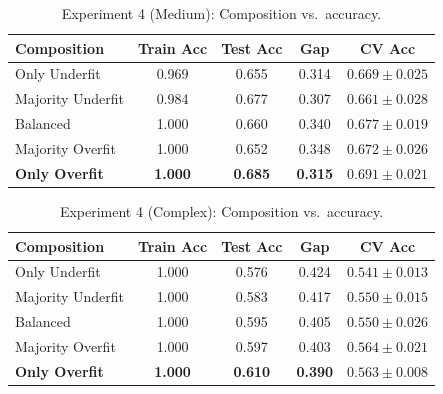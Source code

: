 \documentclass[conference]{IEEEtran}
\begin{document}
\begin{table}[h]
\centering
\caption{Experiment 4 (Medium): Composition vs.\ accuracy.}
\label{tab:exp4-medium}
\begin{tabular}{lcccc}
\toprule
Composition & Train Acc & Test Acc & Gap & CV Acc \\
\midrule
Only Underfit      & 0.969 & 0.655 & 0.314 & $0.669 \pm 0.025$ \\
Majority Underfit  & 0.984 & 0.677 & 0.307 & $0.661 \pm 0.028$ \\
Balanced           & 1.000 & 0.660 & 0.340 & $0.677 \pm 0.019$ \\
Majority Overfit   & 1.000 & 0.652 & 0.348 & $0.672 \pm 0.026$ \\
\textbf{Only Overfit}      & \textbf{1.000} & \textbf{0.685} & \textbf{0.315} & $\mathbf{0.691 \pm 0.021}$ \\
\bottomrule
\end{tabular}
\end{table}

\begin{table}[h]
\centering
\caption{Experiment 4 (Complex): Composition vs.\ accuracy.}
\label{tab:exp4-complex}
\begin{tabular}{lcccc}
\toprule
Composition & Train Acc & Test Acc & Gap & CV Acc \\
\midrule
Only Underfit      & 1.000 & 0.576 & 0.424 & $0.541 \pm 0.013$ \\
Majority Underfit  & 1.000 & 0.583 & 0.417 & $0.550 \pm 0.015$ \\
Balanced           & 1.000 & 0.595 & 0.405 & $0.550 \pm 0.026$ \\
Majority Overfit   & 1.000 & 0.597 & 0.403 & $0.564 \pm 0.021$ \\
\textbf{Only Overfit}      & \textbf{1.000} & \textbf{0.610} & \textbf{0.390} & $\mathbf{0.563 \pm 0.008}$ \\
\bottomrule
\end{tabular}
\end{table}
\end{document}
